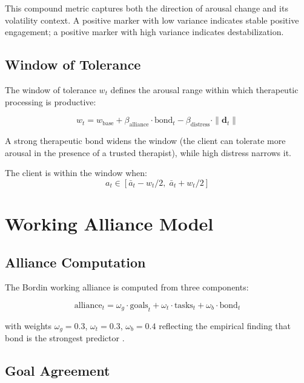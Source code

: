 \documentclass[11pt,a4paper]{article}
\begin{document}
This compound metric captures both the direction of arousal change and its volatility context. A positive marker with low variance indicates stable positive engagement; a positive marker with high variance indicates destabilization.

\subsection{Window of Tolerance}

The window of tolerance $w_t$ defines the arousal range within which therapeutic processing is productive:

\begin{equation}
w_t = w_{\text{base}} + \beta_{\text{alliance}} \cdot \text{bond}_t - \beta_{\text{distress}} \cdot \|\mathbf{d}_t\|
\end{equation}

A strong therapeutic bond widens the window (the client can tolerate more arousal in the presence of a trusted therapist), while high distress narrows it.

The client is within the window when:
\begin{equation}
a_t \in [\bar{a}_t - w_t/2, \; \bar{a}_t + w_t/2]
\end{equation}

\section{Working Alliance Model}

\subsection{Alliance Computation}

The Bordin working alliance is computed from three components:

\begin{equation}
\text{alliance}_t = \omega_g \cdot \text{goals}_t + \omega_t \cdot \text{tasks}_t + \omega_b \cdot \text{bond}_t
\end{equation}

with weights $\omega_g = 0.3$, $\omega_t = 0.3$, $\omega_b = 0.4$ reflecting the empirical finding that bond is the strongest predictor \citep{horvath2011}.

\subsection{Goal Agreement}
\end{document}
